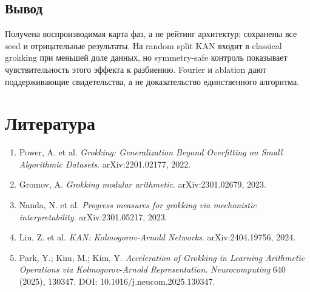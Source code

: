\documentclass[11pt,a4paper]{article}
\begin{document}
\subsection*{Вывод}

Получена воспроизводимая карта фаз, а не рейтинг архитектур; сохранены все seed
и отрицательные результаты. На random split KAN входит в classical grokking
при меньшей доле данных, но symmetry-safe контроль показывает чувствительность
этого эффекта к разбиению. Fourier и ablation дают поддерживающие свидетельства,
а не доказательство единственного алгоритма.

\section*{Литература}

\small
\begin{enumerate}
  \item Power, A. et al. \emph{Grokking: Generalization Beyond Overfitting on
        Small Algorithmic Datasets}. arXiv:2201.02177, 2022.
  \item Gromov, A. \emph{Grokking modular arithmetic}. arXiv:2301.02679, 2023.
  \item Nanda, N. et al. \emph{Progress measures for grokking via mechanistic
        interpretability}. arXiv:2301.05217, 2023.
  \item Liu, Z. et al. \emph{KAN: Kolmogorov-Arnold Networks}.
        arXiv:2404.19756, 2024.
  \item Park, Y.; Kim, M.; Kim, Y. \emph{Acceleration of Grokking in Learning
        Arithmetic Operations via Kolmogorov-Arnold Representation}.
        \emph{Neurocomputing} 640 (2025), 130347.
        DOI: 10.1016/j.neucom.2025.130347.
\end{enumerate}
\end{document}
